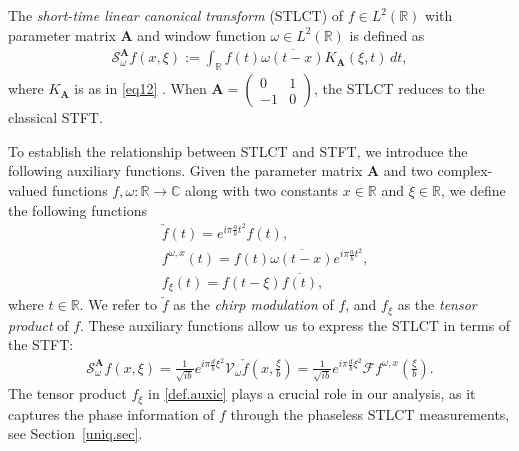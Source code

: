 \documentclass[11pt, reqno]{amsart}
\newcommand{\R}{\mathbb{R}}
\newcommand{\C}{\mathbb{C}}
\numberwithin{equation}{section}
\begin{document}
    The {\em short-time linear canonical transform} (STLCT) of $f \in L^2(\R)$ with parameter matrix $\mathbf{A}$ and window function $\omega \in L^2(\R)$ is defined as
\begin{align}\label{stlct.def}
    \mathcal{S}_\omega^{\mathbf{A}} f(x, \xi) := \int_{\R} f(t) \overline{\omega(t - x)} K_{\mathbf{A}}(\xi, t) \, dt,
\end{align}
where $K_{\mathbf{A}}$ is as in \eqref{eq12} \cite{kou2012windowed, xu2013linear}. When $\mathbf{A} = \begin{pmatrix} 0 & 1 \\ -1 & 0 \end{pmatrix}$, the STLCT reduces to the classical STFT.

    To establish the relationship between STLCT and STFT, we introduce the following auxiliary functions. 
    Given the parameter matrix $\mathbf{A}$ and two complex-valued functions $f, \omega:\R \to \C$  along with two constants $x\in \R$ and $\xi\in \R$,  we define the following functions 
    \begin{subequations}\label{def.auxi}
\begin{align}
&\check{f}(t)= e^{i\pi \frac{a}{b} t^2}f(t), \label{def.auxia}\\
& f^{\omega,x}(t)= f(t)\overline{\omega(t-x)} e^{i\pi \frac{a}{b} t^2},\label{def.auxib} \\
&f_\xi(t)=f(t-\xi)\overline{f(t)}\label{def.auxic},
    \end{align}
\end{subequations}       
    where $t\in \R$. We refer to $\check{f}$ as the \emph{chirp modulation} of $f$, and $f_\xi$ as the \emph{tensor product} of $f$.
    These auxiliary functions allow us to express the STLCT in terms of the STFT:
    \begin{align}\label{eq59}
        \mathcal{S}_\omega^{\mathbf{A}}f (x , \xi) = \frac{1}{\sqrt{i b}} e^{i\pi \frac{d}{b} \xi^2} \mathcal{V}_\omega\check{f} (x , \frac{\xi}{b})  = \frac{1}{\sqrt{i b}} e^{i\pi \frac{d}{b} \xi^2} \mathcal{F} f^{\omega,x} (\frac{\xi}{b}).
    \end{align}
    The tensor product $f_\xi$ in \eqref{def.auxic} plays a crucial role in our analysis, as it captures the phase information of $f$ through the phaseless STLCT measurements, see  Section~\ref{uniq.sec}.
\end{document}
